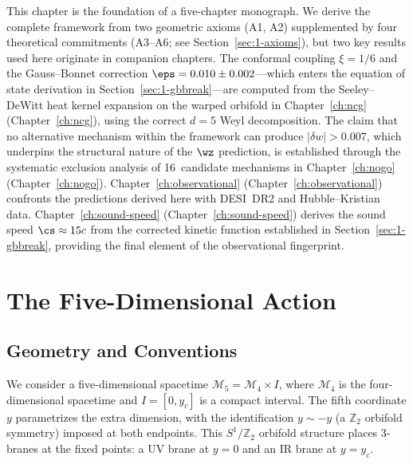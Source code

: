 This chapter is the foundation of a five-chapter monograph. We derive the complete framework from two geometric axioms (A1, A2) supplemented by four theoretical commitments (A3--A6; see Section~\ref{sec:1-axioms}), but two key results used here originate in companion chapters. The conformal coupling $\xi = 1/6$ and the Gauss--Bonnet correction $\eps = 0.010 \pm 0.002$---which enters the equation of state derivation in Section~\ref{sec:1-gbbreak}---are computed from the Seeley--DeWitt heat kernel expansion on the warped orbifold in Chapter~\ref{ch:ncg} (Chapter~\ref{ch:ncg}), using the correct $d = 5$ Weyl decomposition. The claim that no alternative mechanism within the framework can produce $|\delta w| > 0.007$, which underpins the structural nature of the $\wz$ prediction, is established through the systematic exclusion analysis of 16~candidate mechanisms in Chapter~\ref{ch:nogo} (Chapter~\ref{ch:nogo}). Chapter~\ref{ch:observational} (Chapter~\ref{ch:observational}) confronts the predictions derived here with DESI~DR2 and Hubble--Kristian data. Chapter~\ref{ch:sound-speed} (Chapter~\ref{ch:sound-speed}) derives the sound speed $\cs \approx 15c$ from the corrected kinetic function established in Section~\ref{sec:1-gbbreak}, providing the final element of the observational fingerprint.


\section{The Five-Dimensional Action}
\label{sec:1-5daction}

\subsection{Geometry and Conventions}
\label{sec:1-geometry}

We consider a five-dimensional spacetime $\mathcal{M}_5 = \mathcal{M}_4 \times I$, where $\mathcal{M}_4$ is the four-dimensional spacetime and $I = [0, y_c]$ is a compact interval. The fifth coordinate $y$ parametrizes the extra dimension, with the identification $y \sim -y$ (a $\mathbb{Z}_2$ orbifold symmetry) imposed at both endpoints. This $S^1/\mathbb{Z}_2$ orbifold structure places 3-branes at the fixed points: a UV brane at $y = 0$ and an IR brane at $y = y_c$.

